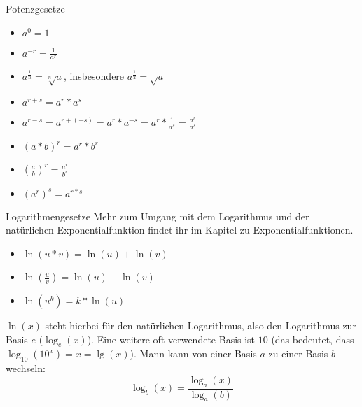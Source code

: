 \begin{bla}{Potenzgesetze}
  \begin{itemize}
    \item $a^0=1$
    \item $a^{-r}=\frac{1}{a^r}$
    \item $a^{\frac{1}{n}}=\sqrt[n]{a}$, insbesondere $a^{\frac{1}{2}}=\sqrt{a}$
    \item $a^{r+s}=a^r*a^s$
    \item $a^{r-s}=a^{r+(-s)}=a^r*a^{-s}=a^r*\frac{1}{a^s}=\frac{a^r}{a^s}$
    \item ${(a*b)}^r=a^r*b^r$
    \item ${(\frac{a}{b})}^r=\frac{a^r}{b^r}$
    \item ${(a^r)}^s=a^{r*s}$
  \end{itemize}
\end{bla}

\begin{bla}{Logarithmengesetze}
  Mehr zum Umgang mit dem Logarithmus und der natürlichen Exponentialfunktion findet ihr im Kapitel zu Exponentialfunktionen.
  \begin{itemize}
    \item $\ln(u*v)=\ln(u)+\ln(v)$
    \item $\ln(\frac{u}{v})=\ln(u)-\ln(v)$
    \item $\ln(u^k)=k*\ln(u)$
  \end{itemize}
  $\ln(x)$ steht hierbei für den natürlichen Logarithmus, also den Logarithmus zur Basis $e$ ($\log_e(x)$). Eine weitere oft verwendete Basis ist $10$ (das bedeutet, dass $\log_{10}(10^x)=x=\lg(x)$). Mann kann von einer Basis $a$ zu einer Basis $b$ wechseln:
  \begin{equation*}
    \log_b(x)=\frac{\log_a(x)}{\log_a(b)}
  \end{equation*}
\end{bla}
